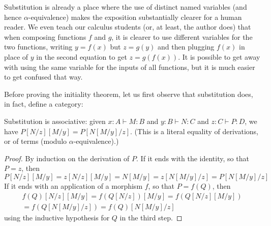 \documentclass{book}
\let\types\vdash
\begin{document}
\begin{rmk}
  Substitution is already a place where the use of distinct named variables (and hence $\alpha$-equivalence) makes the exposition substantially clearer for a human reader.
  We even teach our calculus students (or, at least, the author does) that when composing functions $f$ and $g$, it is clearer to use different variables for the two functions, writing $y=f(x)$ but $z=g(y)$ and then plugging $f(x)$ in place of $y$ in the second equation to get $z = g(f(x))$.
  It is possible to get away with using the same variable for the inputs of all functions, but it is much easier to get confused that way.
\end{rmk}

Before proving the initiality theorem, let us first observe that substitution does, in fact, define a category:

\begin{lem}\label{thm:category-subassoc}
  Substitution is associative: given $x:A\types M:B$ and $y:B\types N:C$ and $z:C\types P:D$, we have $P[N/z][M/y] = P[N[M/y]/z]$.
  (This is a literal equality of derivations, or of terms (modulo $\alpha$-equivalence).)
\end{lem}
\begin{proof}
  By induction on the derivation of $P$.
  If it ends with the identity, so that $P=z$, then
  \[P[N/z][M/y] = z[N/z][M/y] = N[M/y] = z[N[M/y]/z] = P[N[M/y]/z] \]
  If it ends with an application of a morphism $f$, so that $P = f(Q)$, then
  \begin{multline*}
    f(Q)[N/z][M/y] = f(Q[N/z])[M/y] = f(Q[N/z][M/y])\\
    = f(Q[N[M/y]/z]) = f(Q)[N[M/y]/z]
  \end{multline*}
  using the inductive hypothesis for $Q$ in the third step.
\end{proof}
\end{document}
